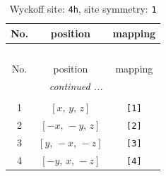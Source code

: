 \documentclass[fleqn,8pt]{jsarticle}
\begin{document}
\begin{longtable}{ccc}
\caption{Wyckoff site: {\tt 4h}, site symmetry: {\tt 1}}
 \\
 \hline \hline
No. & position & mapping \\ \hline \endfirsthead

\multicolumn{2}{l}{\tablename\ \thetable{}} \\
 \hline \hline
No. & position & mapping \\ \hline \endhead

 \hline \hline
\multicolumn{2}{r}{\footnotesize\it continued ...} \\ \endfoot

 \hline \hline
\multicolumn{2}{r}{} \\ \endlastfoot

1 & $\left[ x,\, y,\, z \right]$ & {\tt [1]} \\ \hline
2 & $\left[ - x,\, - y,\, z \right]$ & {\tt [2]} \\ \hline
3 & $\left[ y,\, - x,\, - z \right]$ & {\tt [3]} \\ \hline
4 & $\left[ - y,\, x,\, - z \right]$ & {\tt [4]} \\
\end{longtable}
\end{document}

